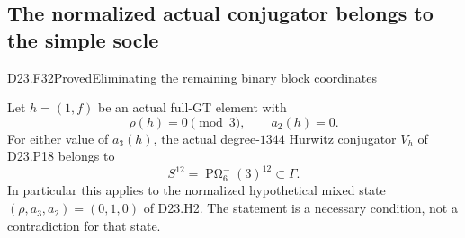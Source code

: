 \subsection{The normalized actual conjugator belongs to the simple socle}

\begin{statement}{D23.F32}{Proved}{Eliminating the remaining binary block coordinates}
\end{statement}
Let $h=(1,f)$ be an actual full-GT element with
\[
                         \rho(h)=0\pmod3,\qquad a_2(h)=0.
\]
For either value of $a_3(h)$, the actual degree-$1344$
Hurwitz conjugator $V_h$ of D23.P18 belongs to
\[
                 S^{12}=\operatorname{P\Omega}_6^-(3)^{12}
                           \subset\Gamma.
\]
In particular this applies to the normalized hypothetical
mixed state $(\rho,a_3,a_2)=(0,1,0)$ of D23.H2. The statement
is a necessary condition, not a contradiction for that state.


